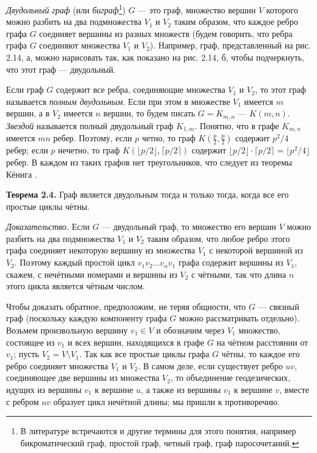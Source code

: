 \textit{Двудольный граф} (или \textit{биграф}\footnote{В литературе встречаются и другие термины для этого понятия, например бикроматический граф, простой граф, четный граф, граф паросочетаний.}) $G$ --- это граф, множество вершин $V$ которого можно разбить на два подмножества $V_1$ и $V_2$ таким образом, что каждое ребро графа $G$ соединяет вершины из разных множеств (будем говорить, что ребра графа $G$ соединяют множества $V_1$ и $V_2$). Например, граф, представленный на рис. 2.14, а, можно нарисовать так, как показано на рис. 2.14, б, чтобы подчеркнуть, что этот граф --- двудольный.

Если граф $G$ содержит все ребра, соединяющие множества $V_1$ и $V_2$, то этот граф называется \textit{полным двудольным}. Если при этом в множестве $V_1$ имеется $m$ вершин, а в $V_2$ имеется $n$ вершин, то будем писать $G = K_{m,n}$ --- $K(m, n)$. \textit{Звездой} называется полный двудольный граф $K_{1,m}$. Понятно, что в графе $K_{m,n}$ имеется $mn$ ребер. Поэтому, если $p$ четно, то граф $K(\frac{p}{2}, \frac{p}{2})$ содержит $p^2/4$ ребер; если $p$ нечетно, то граф $K(\lfloor p/2 \rfloor, \lceil p/2 \rceil)$ содержит $\lfloor p/2 \rfloor \cdot \lceil p/2 \rceil = \lfloor p^2/4 \rfloor$ ребер. В каждом из таких графов нет треугольников, что следует из теоремы Кёнига \cite{2, стр. 170}.

\textbf{Теорема 2.4.} Граф является двудольным тогда и только тогда, когда все его простые циклы чётны.

\textit{Доказательство.} Если $G$ --- двудольный граф, то множество его вершин $V$ можно разбить на два подмножества $V_1$ и $V_2$ таким образом, что любое ребро этого графа соединяет некоторую вершину из множества $V_1$ с некоторой вершиной из $V_2$. Поэтому каждый простой цикл $v_1v_2\ldots v_nv_1$ графа содержит вершины из $V_1$, скажем, с нечётными номерами и вершины из $V_2$ с чётными, так что длина $n$ этого цикла является чётным числом.

Чтобы доказать обратное, предположим, не теряя общности, что $G$ --- связный граф (поскольку каждую компоненту графа $G$ можно рассматривать отдельно). Возьмем произвольную вершину $v_1 \in V$ и обозначим через $V_1$ множество, состоящее из $v_1$ и всех вершин, находящихся в графе $G$ на чётном расстоянии от $v_1$; пусть $V_2 = V \setminus V_1$. Так как все простые циклы графа $G$ чётны, то каждое его ребро соединяет множества $V_1$ и $V_2$. В самом деле, если существует ребро $uv$, соединяющее две вершины из множества $V_2$, то объединение геодезических, идущих из вершины $v_1$ к вершине $u$, а также из вершины $v_1$ к вершине $v$, вместе с ребром $uv$ образует цикл нечётной длины; мы пришли к противоречию.

